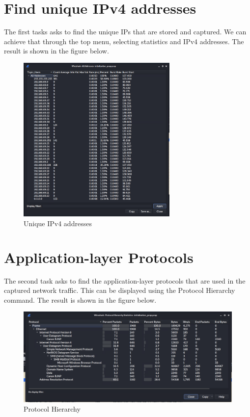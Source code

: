 \section{Find unique IPv4 addresses}
\label{s:Find-Unique-IPv4-Addresses}
The first tasks asks to find the unique IPs that are stored and captured.
We can achieve that through the top menu, selecting statistics and IPv4 addresses.
The result is shown in the figure below.
\begin{figure}[H]
  \centering
  \includegraphics[width=0.7\textwidth]{figures/unique-ipv4-addresses}
  \caption{Unique IPv4 addresses}
  \label{f:unique-ipv4-addresses}
\end{figure}

\section{Application-layer Protocols}
\label{s:Application-layer-Protocols}
The second task asks to find the application-layer protocols that are used in the
captured network traffic. This can be displayed using the Protocol Hierarchy command.
The result is shown in the figure below.
\begin{figure}[ht]
  \centering
  \includegraphics[width=1\textwidth]{figures/protocol-hierarchy}
  \caption{Protocol Hierarchy}
  \label{f:protocol-hierarchy}
\end{figure}

